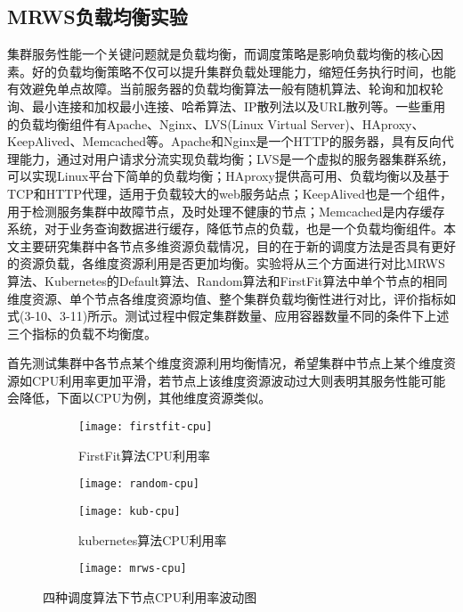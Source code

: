 \subsection{MRWS负载均衡实验}
集群服务性能一个关键问题就是负载均衡，而调度策略是影响负载均衡的核心因素。好的负载均衡策略不仅可以提升集群负载处理能力，缩短任务执行时间，也能有效避免单点故障。当前服务器的负载均衡算法一般有随机算法、轮询和加权轮询、最小连接和加权最小连接、哈希算法、IP散列法以及URL散列等。一些重用的负载均衡组件有Apache、Nginx、LVS(Linux Virtual Server)、HAproxy、KeepAlived、Memcached等。Apache和Nginx是一个HTTP的服务器，具有反向代理能力，通过对用户请求分流实现负载均衡；LVS是一个虚拟的服务器集群系统，可以实现Linux平台下简单的负载均衡；HAproxy提供高可用、负载均衡以及基于TCP和HTTP代理，适用于负载较大的web服务站点；KeepAlived也是一个组件，用于检测服务集群中故障节点，及时处理不健康的节点；Memcached是内存缓存系统，对于业务查询数据进行缓存，降低节点的负载，也是一个负载均衡组件。本文主要研究集群中各节点多维资源负载情况，目的在于新的调度方法是否具有更好的资源负载，各维度资源利用是否更加均衡。实验将从三个方面进行对比MRWS算法、Kubernetes的Default算法、Random算法和FirstFit算法中单个节点的相同维度资源、单个节点各维度资源均值、整个集群负载均衡性进行对比，评价指标如式(3-10、3-11)所示。测试过程中假定集群数量、应用容器数量不同的条件下上述三个指标的负载不均衡度。

首先测试集群中各节点某个维度资源利用均衡情况，希望集群中节点上某个维度资源如CPU利用率更加平滑，若节点上该维度资源波动过大则表明其服务性能可能会降低，下面以CPU为例，其他维度资源类似。
\begin{figure}[h]
	\centering%
	\begin{subfigure}{7cm}
		\texttt{[image: firstfit-cpu]}
		\caption{FirstFit算法CPU利用率}
	\end{subfigure}%
	\hspace{0.5cm}%
	\begin{subfigure}{7cm}
		\texttt{[image: random-cpu]}
	\end{subfigure}
	\begin{subfigure}{7cm}
		\texttt{[image: kub-cpu]}
		\caption{kubernetes算法CPU利用率}
	\end{subfigure}%
	\hspace{0.5cm}%
	\begin{subfigure}{7cm}
		\texttt{[image: mrws-cpu]}
	\end{subfigure}
	\caption{四种调度算法下节点CPU利用率波动图}
	
\end{figure}

